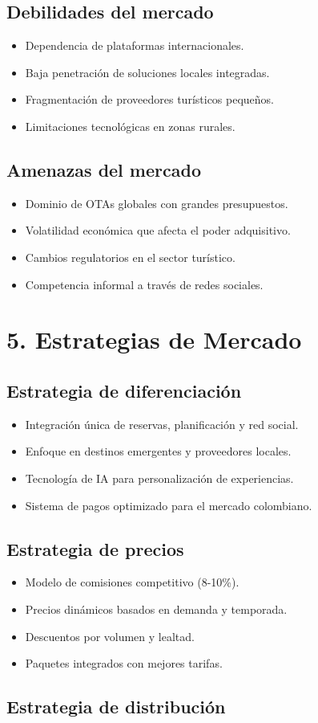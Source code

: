 \documentclass[12pt,a4paper]{article}
\newcommand{\sectiontitle}[1]{\section{#1}}
\newcommand{\subsectiontitle}[1]{\subsection{#1}}
\begin{document}
\subsectiontitle{Debilidades del mercado}

\begin{itemize}
    \item Dependencia de plataformas internacionales.
    \item Baja penetración de soluciones locales integradas.
    \item Fragmentación de proveedores turísticos pequeños.
    \item Limitaciones tecnológicas en zonas rurales.
\end{itemize}

\subsectiontitle{Amenazas del mercado}

\begin{itemize}
    \item Dominio de OTAs globales con grandes presupuestos.
    \item Volatilidad económica que afecta el poder adquisitivo.
    \item Cambios regulatorios en el sector turístico.
    \item Competencia informal a través de redes sociales.
\end{itemize}

\sectiontitle{5. Estrategias de Mercado}

\subsectiontitle{Estrategia de diferenciación}

\begin{itemize}
    \item Integración única de reservas, planificación y red social.
    \item Enfoque en destinos emergentes y proveedores locales.
    \item Tecnología de IA para personalización de experiencias.
    \item Sistema de pagos optimizado para el mercado colombiano.
\end{itemize}

\subsectiontitle{Estrategia de precios}

\begin{itemize}
    \item Modelo de comisiones competitivo (8-10\%).
    \item Precios dinámicos basados en demanda y temporada.
    \item Descuentos por volumen y lealtad.
    \item Paquetes integrados con mejores tarifas.
\end{itemize}

\subsectiontitle{Estrategia de distribución}
\end{document}
